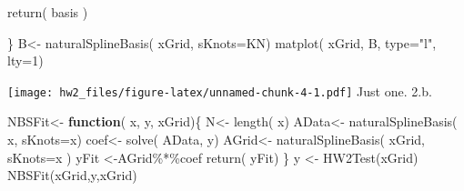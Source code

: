 \documentclass[
]{article}
\newenvironment{Shaded}{\begin{snugshade}}{\end{snugshade}}
\newcommand{\AttributeTok}[1]{\textcolor[rgb]{0.77,0.63,0.00}{#1}}
\newcommand{\ControlFlowTok}[1]{\textcolor[rgb]{0.13,0.29,0.53}{\textbf{#1}}}
\newcommand{\DecValTok}[1]{\textcolor[rgb]{0.00,0.00,0.81}{#1}}
\newcommand{\FunctionTok}[1]{\textcolor[rgb]{0.00,0.00,0.00}{#1}}
\newcommand{\NormalTok}[1]{#1}
\newcommand{\OtherTok}[1]{\textcolor[rgb]{0.56,0.35,0.01}{#1}}
\newcommand{\SpecialCharTok}[1]{\textcolor[rgb]{0.00,0.00,0.00}{#1}}
\newcommand{\StringTok}[1]{\textcolor[rgb]{0.31,0.60,0.02}{#1}}
\begin{document}
\begin{Shaded}
\begin{Highlighting}[]
  \FunctionTok{return}\NormalTok{( basis )}
  
\NormalTok{\}}
\NormalTok{B}\OtherTok{\textless{}{-}} \FunctionTok{naturalSplineBasis}\NormalTok{( xGrid, }\AttributeTok{sKnots=}\NormalTok{KN)}
\FunctionTok{matplot}\NormalTok{( xGrid, B, }\AttributeTok{type=}\StringTok{"l"}\NormalTok{, }\AttributeTok{lty=}\DecValTok{1}\NormalTok{)}
\end{Highlighting}
\end{Shaded}

\texttt{[image: hw2\_files/figure-latex/unnamed-chunk-4-1.pdf]} Just one.
2.b.

\begin{Shaded}
\begin{Highlighting}[]
\NormalTok{NBSFit}\OtherTok{\textless{}{-}} \ControlFlowTok{function}\NormalTok{( x, y, xGrid)\{}
\NormalTok{N}\OtherTok{\textless{}{-}} \FunctionTok{length}\NormalTok{( x)}
\NormalTok{AData}\OtherTok{\textless{}{-}} \FunctionTok{naturalSplineBasis}\NormalTok{( x, }\AttributeTok{sKnots=}\NormalTok{x)}
\NormalTok{coef}\OtherTok{\textless{}{-}} \FunctionTok{solve}\NormalTok{( AData, y)}
\NormalTok{AGrid}\OtherTok{\textless{}{-}} \FunctionTok{naturalSplineBasis}\NormalTok{( xGrid, }\AttributeTok{sKnots=}\NormalTok{x )}
\NormalTok{yFit }\OtherTok{\textless{}{-}}\NormalTok{AGrid}\SpecialCharTok{\%*\%}\NormalTok{coef}
\FunctionTok{return}\NormalTok{( yFit)}
\NormalTok{\}}
\NormalTok{y }\OtherTok{\textless{}{-}} \FunctionTok{HW2Test}\NormalTok{(xGrid)}
\FunctionTok{NBSFit}\NormalTok{(xGrid,y,xGrid)}
\end{Highlighting}
\end{Shaded}
\end{document}
